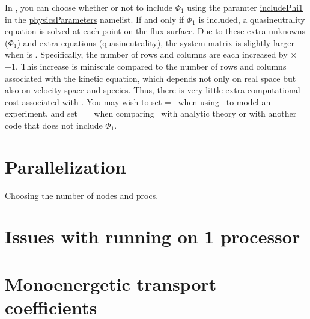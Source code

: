In \sfincs, you can choose whether or not to
include $\Phi_1$ using the paramter {\ttfamily \hyperlink{includePhi1}{includePhi1}} in the 
{\ttfamily \hyperref[sec:physicsParameters]{physicsParameters}}
namelist.  If and only if $\Phi_1$ is included, a quasineutrality equation is solved
at each point on the flux surface.  Due to these extra unknowns ($\Phi_1$) and extra equations
(quasineutrality), the system matrix is slightly larger when  is \true.
Specifically, the number of rows and columns are each increased by \Ntheta$\times$\Nzeta$+1$.  This increase is miniscule compared
to the number of rows and columns associated with the kinetic equation, which depends not only on real space
but also on velocity space and species.  Thus, there is very little extra computational cost associated
with .  You may wish to set  = \true~when
using \sfincs~to model an experiment, and set  = \false~when
comparing \sfincs~with analytic theory or with another code that does not include $\Phi_1$.

\section{Parallelization}
Choosing the number of nodes and procs.

\section{Issues with running on 1 processor}

\section{Monoenergetic transport coefficients}
\label{sec:monoenergetic}

